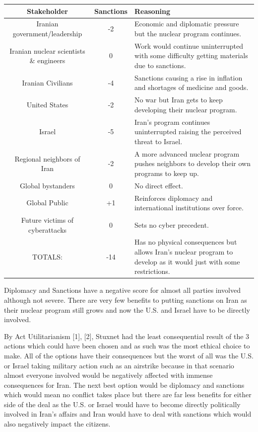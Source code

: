 \begin{table}[h]
\centering
\begin{tabular}{|c|c|p{8cm}|}
\hline
Stakeholder & Sanctions & Reasoning \\ \hline
Iranian government/leadership & -2 & Economic and diplomatic pressure but the nuclear program continues. \\ \hline
Iranian nuclear scientists \& engineers & 0 & Work would continue uninterrupted with some difficulty getting materials due to sanctions. \\ \hline
Iranian Civilians & -4 & Sanctions causing a rise in inflation and shortages of medicine and goods. \\ \hline
United States & -2 & No war but Iran gets to keep developing their nuclear program. \\ \hline
Israel & -5 & Iran’s program continues uninterrupted raising the perceived threat to Israel. \\ \hline
Regional neighbors of Iran & -2 & A more advanced nuclear program pushes neighbors to develop their own programs to keep up. \\ \hline
Global bystanders & 0 & No direct effect. \\ \hline
Global Public & +1 & Reinforces diplomacy and international institutions over force. \\ \hline
Future victims of cyberattacks & 0 & Sets no cyber precedent. \\ \hline
TOTALS: & -14 & Has no physical consequences but allows Iran’s nuclear program to develop as it would just with some restrictions. \\ \hline
\end{tabular}
\end{table}

Diplomacy and Sanctions have a negative score for almost all parties involved although not severe. There are very few benefits to putting sanctions on Iran as their nuclear program still grows and now the U.S. and Israel have to be directly involved.

By Act Utilitarianism [1], [2], Stuxnet had the least consequential result of the 3 actions which could have been chosen and as such was the most ethical choice to make. All of the options have their consequences but the worst of all was the U.S. or Israel taking military action such as an airstrike because in that scenario almost everyone involved would be negatively affected with immense consequences for Iran. The next best option would be diplomacy and sanctions which would mean no conflict takes place but there are far less benefits for either side of the deal as the U.S. or Israel would have to become directly politically involved in Iran’s affairs and Iran would have to deal with sanctions which would also negatively impact the citizens.

